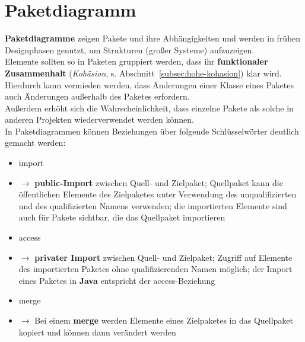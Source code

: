 \section{Paketdiagramm}

\begin{tcolorbox}[title=Paketdiagramm]
    \textbf{Paketdiagramme} zeigen Pakete und ihre Abhängigkeiten und werden in frühen Designphasen genutzt, um Strukturen (großer Systeme) aufzuzeigen.\\

    \noindent
    Elemente sollten so in Paketen gruppiert werden, dass ihr \textbf{funktionaler Zusammenhalt} (\textit{Kohäsion}, s. Abschnitt~\ref{subsec:hohe-kohasion}) klar wird.\\
    Hierdurch kann vermieden werden, dass Änderungen einer Klasse eines Paketes auch Änderungen außerhalb des Paketes erfordern.\\
    Außerdem erhöht sich die Wahrscheinlichkeit, dass einzelne Pakete als solche in anderen Projekten wiederverwendet werden können.\\

    \noindent
    In Paketdiagrammen können Beziehungen über folgende Schlüsselwörter deutlich gemacht werden:

    \begin{itemize}
        \item \guillemotleft import\guillemotright
        \item[] $\rightarrow$ \textbf{public-Import} zwischen Quell- und Zielpaket; Quellpaket kann die öffentlichen Elemente des Zielpaketes unter Verwendung des unqualifizierten und des qualifizierten Namens verwenden; die importierten Elemente sind auch für Pakete sichtbar, die das Quellpaket importieren
        \item \guillemotleft access\guillemotright
        \item[] $\rightarrow$ \textbf{privater Import} zwischen Quell- und Zielpaket; Zugriff auf Elemente des importierten Paketes ohne qualifizierenden Namen möglich; der Import eines Paketes in \textbf{Java} entspricht der \guillemotleft access\guillemotright-Beziehung
        \item \guillemotleft merge\guillemotright
        \item[] $\rightarrow$ Bei einem \textbf{merge} werden Elemente eines Zielpaketes in das Quellpaket kopiert und können dann verändert werden
   \end{itemize}
\end{tcolorbox}